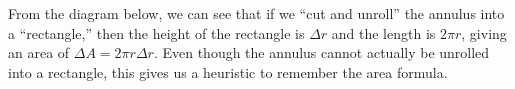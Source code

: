 \documentclass{article}
\begin{document}
\begin{enumerate}
\begin{enumerate}
    \begin{solution}
    From the diagram below, we can see that if we ``cut and unroll'' the annulus into a ``rectangle,'' then the height of the rectangle is $\Delta r$ and the length is $2\pi r$, giving an area of $\Delta A = 2\pi r \Delta r$. Even though the annulus cannot actually be unrolled into a rectangle, this gives us a heuristic to remember the area formula.
    
    \end{solution}
\end{enumerate}

\end{enumerate}

\end{document}
